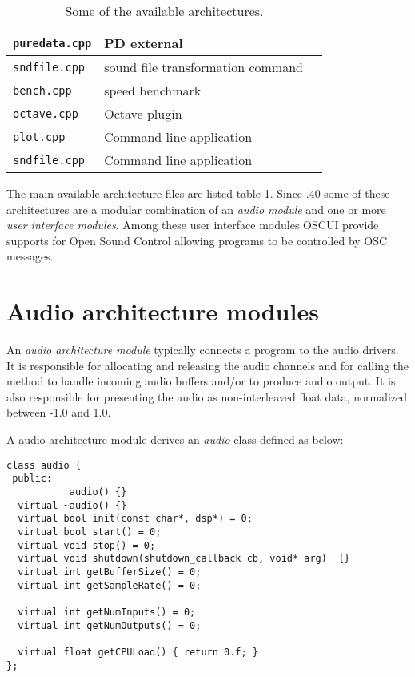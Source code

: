 \begin{table}[htp]
\begin{center}
\begin{tabular}{|l|l|l|}
\texttt{puredata.cpp} 		& PD external  \\
\hline
\texttt{sndfile.cpp} 		& sound file transformation command \\
\texttt{bench.cpp} 		& speed benchmark   \\
\texttt{octave.cpp} 		& Octave plugin   \\
\texttt{plot.cpp} 			& Command line application    \\
\texttt{sndfile.cpp} 		& Command line application    \\
\hline
\end{tabular}
\end{center}
\caption{Some of the available architectures.}
\label{tab:availablearch}
\end{table}%

The main available architecture files are listed table \ref{tab:availablearch}. Since .40 some of these architectures are a modular combination of an \emph{audio module} and one or more \emph{user interface modules}. Among these user interface modules OSCUI provide supports for Open Sound Control allowing \faust programs to be controlled by OSC messages. 

\section{Audio architecture modules} 
An \emph{audio architecture module} typically connects a \faust program to the audio drivers.
It is responsible for allocating and releasing the audio channels and for calling the \faust {} method to handle incoming audio buffers and/or to produce audio output. It is also responsible for presenting the audio as non-interleaved float data, normalized between -1.0 and 1.0.

A \faust audio architecture module derives an \emph{audio} class defined as below:
\begin{lstlisting}[basicstyle=\ttfamily\footnotesize\color{yotxt}]
class audio {
 public:
           audio() {}
  virtual ~audio() {}
  virtual bool init(const char*, dsp*) = 0;
  virtual bool start() = 0;
  virtual void stop() = 0;
  virtual void shutdown(shutdown_callback cb, void* arg)  {}
  virtual int getBufferSize() = 0;
  virtual int getSampleRate() = 0;
    
  virtual int getNumInputs() = 0;
  virtual int getNumOutputs() = 0;
    
  virtual float getCPULoad() { return 0.f; }
};
\end{lstlisting} 

